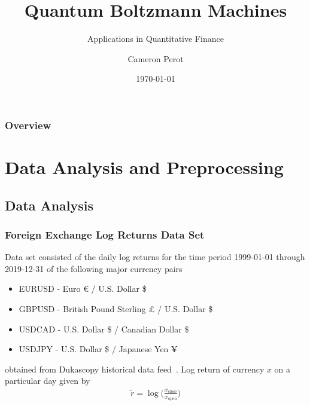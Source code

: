 \documentclass{beamer}
\title{Quantum Boltzmann Machines}
\subtitle{Applications in Quantitative Finance}
\author{Cameron Perot}
\institute{JSC}
\date{\today}
\begin{document}

\maketitle


\begin{frame}
    \frametitle{Overview}
    \tableofcontents
\end{frame}


\section{Data Analysis and Preprocessing}

\subsection{Data Analysis}
\begin{frame}
    \frametitle{Foreign Exchange Log Returns Data Set}
    Data set consisted of the daily log returns for the time period 1999-01-01 through 2019-12-31 of the following major currency pairs
    \begin{itemize}
        \item EURUSD - Euro € / U.S. Dollar \$
        \item GBPUSD - British Pound Sterling £ / U.S. Dollar \$
        \item USDCAD - U.S. Dollar \$ / Canadian Dollar \$
        \item USDJPY - U.S. Dollar \$ / Japanese Yen ¥
    \end{itemize}
    obtained from Dukascopy historical data feed~\cite{dukascopy}.
    Log return of currency \( x \) on a particular day given by
    \begin{align}
        \tilde{r}
            = \log\bigg( \frac{x_\text{close}}{x_\text{open}} \bigg)
    \end{align}
\end{frame}
\end{document}

